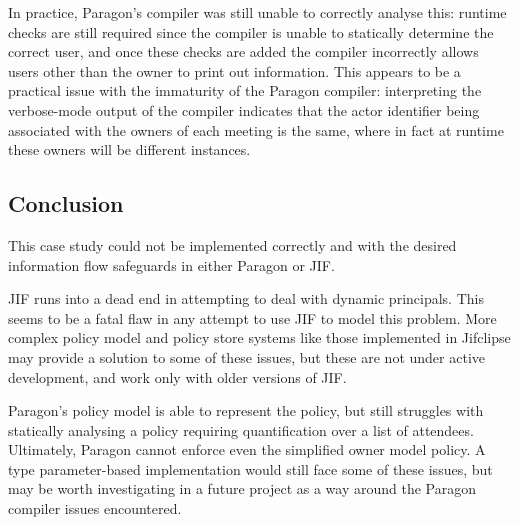 In practice, Paragon's compiler was still unable to correctly analyse this: runtime checks are still required since the compiler is unable to statically determine the correct user, and once these checks are added the compiler incorrectly allows users other than the owner to print out information. This appears to be a practical issue with the immaturity of the Paragon compiler: interpreting the verbose-mode output of the compiler indicates that the actor identifier being associated with the owners of each meeting is the same, where in fact at runtime these owners will be different instances.

\subsection{Conclusion}

This case study could not be implemented correctly and with the desired information flow safeguards in either Paragon or JIF.

JIF runs into a dead end in attempting to deal with dynamic principals. This seems to be a fatal flaw in any attempt to use JIF to model this problem. More complex policy model and policy store systems like those implemented in Jifclipse \cite{hicks2007jifclipse} may provide a solution to some of these issues, but these are not under active development, and work only with older versions of JIF.

Paragon's policy model is able to represent the policy, but still struggles with statically analysing a policy requiring quantification over a list of attendees. Ultimately, Paragon cannot enforce even the simplified owner model policy. A type parameter-based implementation would still face some of these issues, but may be worth investigating in a future project as a way around the Paragon compiler issues encountered.